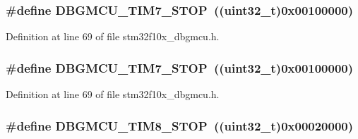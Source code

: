 \subsubsection[{\texorpdfstring{D\+B\+G\+M\+C\+U\+\_\+\+T\+I\+M7\+\_\+\+S\+T\+OP}{DBGMCU_TIM7_STOP}}]{\setlength{\rightskip}{0pt plus 5cm}\#define D\+B\+G\+M\+C\+U\+\_\+\+T\+I\+M7\+\_\+\+S\+T\+OP~(({\bf uint32\+\_\+t})0x00100000)}\hypertarget{group___d_b_g_m_c_u___exported___constants_gaf593ca16ee6d3f1fabc549878f3f87f0}{}\label{group___d_b_g_m_c_u___exported___constants_gaf593ca16ee6d3f1fabc549878f3f87f0}


Definition at line 69 of file stm32f10x\+\_\+dbgmcu.\+h.

\subsubsection[{\texorpdfstring{D\+B\+G\+M\+C\+U\+\_\+\+T\+I\+M7\+\_\+\+S\+T\+OP}{DBGMCU_TIM7_STOP}}]{\setlength{\rightskip}{0pt plus 5cm}\#define D\+B\+G\+M\+C\+U\+\_\+\+T\+I\+M7\+\_\+\+S\+T\+OP~(({\bf uint32\+\_\+t})0x00100000)}\hypertarget{group___d_b_g_m_c_u___exported___constants_gaf593ca16ee6d3f1fabc549878f3f87f0}{}\label{group___d_b_g_m_c_u___exported___constants_gaf593ca16ee6d3f1fabc549878f3f87f0}


Definition at line 69 of file stm32f10x\+\_\+dbgmcu.\+h.

\subsubsection[{\texorpdfstring{D\+B\+G\+M\+C\+U\+\_\+\+T\+I\+M8\+\_\+\+S\+T\+OP}{DBGMCU_TIM8_STOP}}]{\setlength{\rightskip}{0pt plus 5cm}\#define D\+B\+G\+M\+C\+U\+\_\+\+T\+I\+M8\+\_\+\+S\+T\+OP~(({\bf uint32\+\_\+t})0x00020000)}\hypertarget{group___d_b_g_m_c_u___exported___constants_gaa66feea7d5f2c253fe3f431f9dd4bd1e}{}\label{group___d_b_g_m_c_u___exported___constants_gaa66feea7d5f2c253fe3f431f9dd4bd1e}



